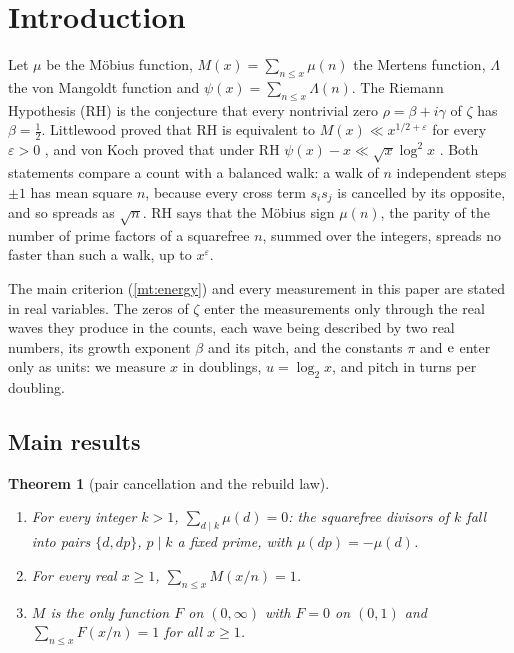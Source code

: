\documentclass[11pt]{article}
\newtheorem{theorem}{Theorem}[section]
\theoremstyle{definition}\newtheorem{definition}[theorem]{Definition}
\theoremstyle{remark}\newtheorem{remark}[theorem]{Remark}
\begin{document}
\tableofcontents

\section{Introduction}\label{sec:intro}

Let $\mu$ be the Möbius function, $M(x)=\sum_{n\le x}\mu(n)$ the Mertens function, $\Lambda$ the von Mangoldt function and $\psi(x)=\sum_{n\le x}\Lambda(n)$. The Riemann Hypothesis (RH) is the conjecture that every nontrivial zero $\rho=\beta+i\gamma$ of $\zeta$ has $\beta=\frac12$. Littlewood proved that RH is equivalent to $M(x)\ll x^{1/2+\varepsilon}$ for every $\varepsilon>0$ \cite[\S14.25]{Titchmarsh}, and von Koch proved that under RH $\psi(x)-x\ll\sqrt x\log^2x$ \cite{vonKoch}. Both statements compare a count with a balanced walk: a walk of $n$ independent steps $\pm1$ has mean square $n$, because every cross term $s_is_j$ is cancelled by its opposite, and so spreads as $\sqrt n$. RH says that the Möbius sign $\mu(n)$, the parity of the number of prime factors of a squarefree $n$, summed over the integers, spreads no faster than such a walk, up to $x^\varepsilon$.

The main criterion (\cref{mt:energy}) and every measurement in this paper are stated in real variables. The zeros of $\zeta$ enter the measurements only through the real waves they produce in the counts, each wave being described by two real numbers, its growth exponent $\beta$ and its pitch, and the constants $\pi$ and $\mathrm e$ enter only as units: we measure $x$ in doublings, $u=\log_2x$, and pitch in turns per doubling.

\subsection{Main results}

\begin{theorem}[pair cancellation and the rebuild law]\label{mt:rebuild}
\begin{enumerate}[label=\textup{(\roman*)}]
\item For every integer $k>1$, $\sum_{d\mid k}\mu(d)=0$: the squarefree divisors of $k$ fall into pairs $\{d,dp\}$, $p\mid k$ a fixed prime, with $\mu(dp)=-\mu(d)$.
\item For every real $x\ge1$, $\sum_{n\le x}M(x/n)=1$.
\item $M$ is the only function $F$ on $(0,\infty)$ with $F=0$ on $(0,1)$ and $\sum_{n\le x}F(x/n)=1$ for all $x\ge1$.
\end{enumerate}
\end{theorem}
\end{document}
